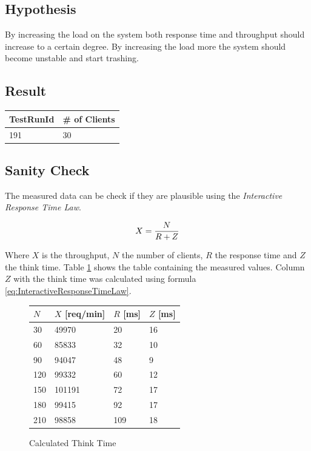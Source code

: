\documentclass[a4paper]{article}
\begin{document}
\subsection{Hypothesis}

By increasing the load on the system both response time and throughput should increase to
a certain degree. By increasing the load more the system should become unstable and start
trashing.

\subsection{Result}


\begin{tabular}{|l|l|}
\hline 
TestRunId & \# of Clients \\ 
\hline 
191 & 30 \\ 
\hline 
\end{tabular} 

\subsection{Sanity Check}

The measured data can be check if they are plausible using the \textit{Interactive Response Time Law}.

\begin{equation}
\label{eq:InteractiveResponseTimeLaw}
X = {{N} \over {R + Z}}
\end{equation}


Where $X$ is the throughput, $N$ the number of clients, $R$ the response time and $Z$ the think 	time. Table \ref{tabular:experimentsanitycheck} shows the table containing the measured values. Column $Z$ with the think time was calculated using formula \ref{eq:InteractiveResponseTimeLaw}. 

\begin{figure}[H]
\label{tabular:experimentsanitycheck}
\begin{center}
\begin{tabular}{|l|l|l|l|}
\hline 
$N$ & $X$ [req/min] & $R$ [ms] & $Z$ [ms]\\
\hline 
30&	49970&	20&	16\\
60&	85833&	32&	10\\
90&	94047&	48&	9\\
120&	99332&	60&	12\\
150&	101191&	72&	17\\
180&	99415&	92&	17\\
210&	98858&	109&	18\\
\hline 
\end{tabular} 
\caption{Calculated Think Time}
\end{center}
\end{figure}
\end{document}

